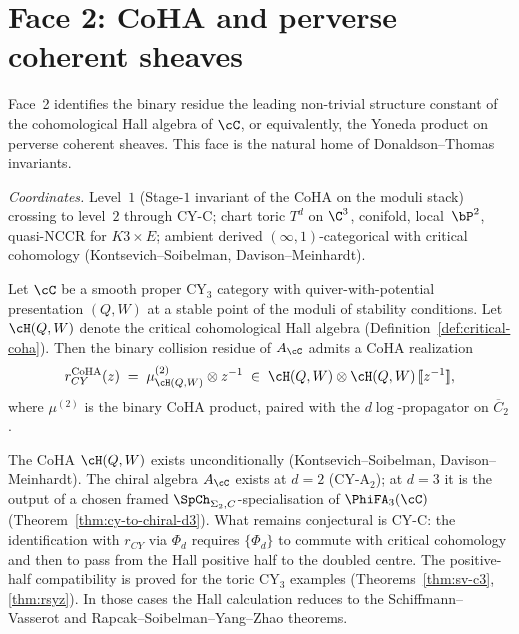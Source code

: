 \section{Face 2: CoHA and perverse coherent sheaves}
\label{sec:face2-coha}

Face~2 identifies the binary residue  the
leading non-trivial structure constant of the cohomological Hall
algebra of $\cC$, or equivalently, the Yoneda product on perverse
coherent sheaves. This face is the natural home of
Donaldson--Thomas invariants.

\smallskip
\noindent\emph{Coordinates.} Level~$1$ \textup{(}Stage-$1$ invariant
of the CoHA on the moduli stack\textup{)} crossing to level~$2$
through CY-C; chart toric $T^d$ on $\C^3$, conifold, local~$\bP^2$,
quasi-NCCR for $K3 \times E$; ambient derived
$(\infty, 1)$-categorical with critical cohomology
\textup{(}Kontsevich--Soibelman, Davison--Meinhardt\textup{)}.

\begin{conjecture}
\label{conj:face2-coha-realization}
\ClaimStatusConjectured
Let $\cC$ be a smooth proper CY$_3$ category with quiver-with-potential
presentation $(Q, W)$ at a stable point of the moduli of stability
conditions. Let $\cH(Q,W)$ denote the critical cohomological Hall
algebra (Definition~\ref{def:critical-coha}). Then the binary collision
residue of $A_\cC$ admits a CoHA realization
\[
 r_{CY}^{\mathrm{CoHA}}(z) \;=\; \mu_{\cH(Q,W)}^{(2)} \otimes z^{-1}
 \;\in\; \cH(Q,W) \otimes \cH(Q,W) \,[\![z^{-1}]\!],
\]
where $\mu^{(2)}$ is the binary CoHA product, paired with the
$d\log$-propagator on $\overline{C}_2$.
\end{conjecture}

\begin{remark}
\label{rem:face2-obstruction}
The CoHA $\cH(Q,W)$ exists unconditionally (Kontsevich--Soibelman,
Davison--Meinhardt). The chiral algebra $A_\cC$ exists at $d = 2$
(CY-A$_2$); at $d = 3$ it is the output of a chosen framed
$\SpCh_{\Sigma_2,C}$-specialisation of $\PhiFA_3(\cC)$
(Theorem~\ref{thm:cy-to-chiral-d3}). What remains conjectural is CY-C:
the identification with $r_{CY}$ via $\Phi_d$ requires
$\{\Phi_d\}$ to commute with critical cohomology and then to pass from
the Hall positive half to the doubled centre. The positive-half
compatibility is proved for the toric CY$_3$ examples
(Theorems~\ref{thm:sv-c3}, \ref{thm:rsyz}). In those cases the
Hall calculation reduces to the Schiffmann--Vasserot and
Rapcak--Soibelman--Yang--Zhao theorems.
\end{remark}


